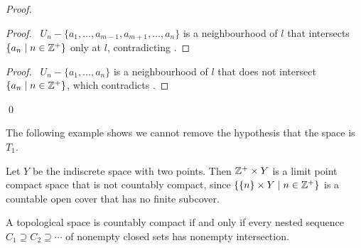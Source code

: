 \begin{proof}
    \pf
    \begin{proof}
        \pf\ $U_n - \{ a_1, \ldots, a_{m-1}, a_{m+1}, \ldots, a_n \}$
        is a neighbourhood of $l$ that intersects $\{ a_n \mid n \in \mathbb{Z}^+ \}$
        only at $l$, contradicting .
    \end{proof}
    \begin{proof}
        \pf\ $U_n - \{ a_1, \ldots, a_n \}$ is a neighbourhood of $l$ that does not intersect $\{ a_n \mid n \in \mathbb{Z}^+ \}$,
        which contradicts .
    \end{proof}
    \qed
\end{proof}

The following example shows we cannot remove the hypothesis that the space is $T_1$.

\begin{example}
    Let $Y$ be the indiscrete space with two points. Then $\mathbb{Z}^+ \times Y$
    is a limit point compact space that is not countably compact,
    since $\{ \{n\} \times Y \mid n \in \mathbb{Z}^+ \}$ is a countable open
    cover that has no finite subcover.
\end{example}

\begin{proposition}
    \label{proposition:nested_sequence_nonempty_intersection}
    A topological space is countably compact if and only if every nested sequence
    $C_1 \supseteq C_2 \supseteq \cdots$ of nonempty closed sets has nonempty intersection.
\end{proposition}

